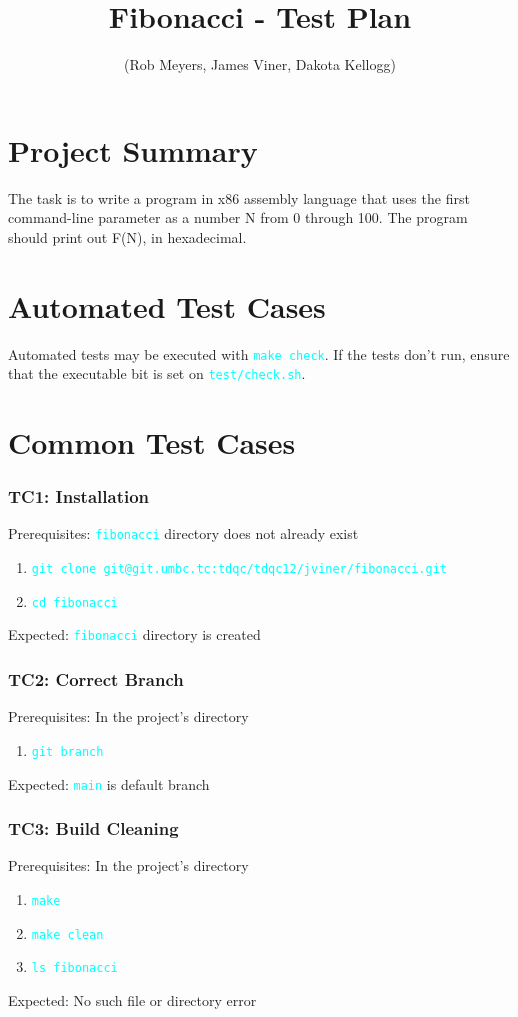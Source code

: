 \documentclass{article}
\title{Fibonacci - Test Plan}
\author{(Rob Meyers, James Viner, Dakota Kellogg)}
\date{}
\newcommand{\code}[1]{\textcolor{cyan}{\texttt{#1}}}
\begin{document}
\maketitle

\section*{Project Summary}
The task is to write a program in x86 assembly language that uses the
first command-line parameter as a number N from 0 through 100. The
program should print out F(N), in hexadecimal.




\section*{Automated Test Cases}
Automated tests may be executed with \code{make check}.
If the tests don't run, ensure that the executable bit is set on
\code{test/check.sh}.



\section*{Common Test Cases}

\subsubsection{TC1: Installation}
Prerequisites: \code{fibonacci} directory does not already exist
\begin{enumerate}
	\item \code{git clone git@git.umbc.tc:tdqc/tdqc12/jviner/fibonacci.git}
	\item \code{cd fibonacci}
\end{enumerate}
Expected: \code{fibonacci} directory is created


\subsubsection{TC2: Correct Branch}
Prerequisites: In the project's directory
\begin{enumerate}
	\item \code{git branch}
\end{enumerate}
Expected: \code{main} is default branch


\subsubsection{TC3: Build Cleaning}
Prerequisites: In the project's directory
\begin{enumerate}
	\item \code{make}
	\item \code{make clean}
	\item \code{ls fibonacci}
\end{enumerate}
Expected: No such file or directory error
\end{document}

